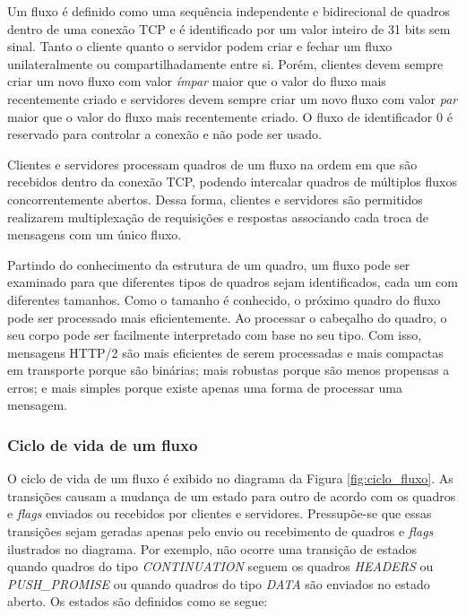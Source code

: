 Um fluxo é definido como uma sequência independente e bidirecional de quadros dentro de uma conexão TCP e é identificado por um valor inteiro de 31 bits sem sinal. Tanto o cliente quanto o servidor podem criar e fechar um fluxo unilateralmente ou compartilhadamente entre si. Porém, clientes devem sempre criar um novo fluxo com valor {\em ímpar} maior que o valor do fluxo mais recentemente criado e servidores devem sempre criar um novo fluxo com valor {\em par} maior que o valor do fluxo mais recentemente criado. O fluxo de identificador 0 é reservado para controlar a conexão e não pode ser usado.

Clientes e servidores processam quadros de um fluxo na ordem em que são recebidos dentro da conexão TCP, podendo intercalar quadros de múltiplos fluxos concorrentemente abertos. Dessa forma, clientes e servidores são permitidos realizarem multiplexação de requisições e respostas associando cada troca de mensagens com um único fluxo.

Partindo do conhecimento da estrutura de um quadro, um fluxo pode ser examinado para que diferentes tipos de quadros sejam identificados, cada um com diferentes tamanhos. Como o tamanho é conhecido, o próximo quadro do fluxo pode ser processado mais eficientemente. Ao processar o cabeçalho do quadro, o seu corpo pode ser facilmente interpretado com base no seu tipo. Com isso, mensagens HTTP/2 são mais eficientes de serem processadas e mais compactas em transporte porque são binárias; mais robustas porque são menos propensas a erros; e mais simples porque existe apenas uma forma de processar uma mensagem.

\subsubsection{Ciclo de vida de um fluxo}

O ciclo de vida de um fluxo é exibido no diagrama da Figura \ref{fig:ciclo_fluxo}. As transições causam a mudança de um estado para outro de acordo com os quadros e {\em flags} enviados ou recebidos por clientes e servidores. Pressupõe-se que essas transições sejam geradas apenas pelo envio ou recebimento de quadros e {\em flags} ilustrados no diagrama. Por exemplo, não ocorre uma transição de estados quando quadros do tipo {\em CONTINUATION} seguem os quadros {\em HEADERS} ou {\em PUSH\_PROMISE} ou quando quadros do tipo {\em DATA} são enviados no estado aberto. Os estados são definidos como se segue:

